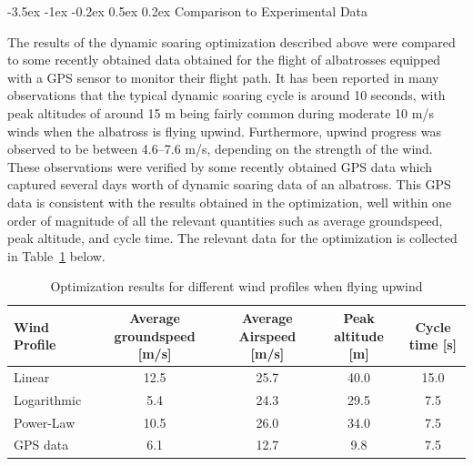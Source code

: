 \documentclass[11pt,letterpaper,onecolumn]{article}
\makeatletter
\renewcommand\subsection{\@startsection{subsection}{1}{\z@}%
{-3.5ex \@plus-1ex \@minus-0.2ex}%
{0.5ex \@plus0.2ex}%
{\fontsize{10pt}{10pt}\selectfont\bfseries\sffamily}}
\makeatother
\begin{document}
  \subsection{Comparison to Experimental Data}

  The results of the dynamic soaring optimization described above were compared to some recently obtained data obtained for the flight of albatrosses equipped with a GPS sensor to monitor their flight path.
  It has been reported in many observations that the typical dynamic soaring cycle is around 10 seconds, with peak altitudes of around 15 m being fairly common during moderate 10 m/s winds when the albatross is flying upwind.
  Furthermore, upwind progress was observed to be between 4.6--7.6 m/s, depending on the strength of the wind.
  These observations were verified by some recently obtained GPS data which captured several days worth of dynamic soaring data of an albatross.\cite{sachs.progress.2011,sachs.experimental.2013} This GPS data is consistent with the results obtained in the optimization, well within one order of magnitude of all the relevant quantities such as average groundspeed, peak altitude, and cycle time.
  The relevant data for the optimization is collected in Table~\ref{tab.results} below.

  \begin{table}[H]
    \centering
    \caption{Optimization results for different wind profiles when flying upwind}
    \begin{tabular}{lcccc}
      \toprule
      Wind Profile  & Average groundspeed [m/s] & Average Airspeed [m/s]  & Peak altitude [m] & Cycle time [s] \\ \midrule
      Linear        & 12.5                      & 25.7                    & 40.0              & 15.0 \\
      Logarithmic   & 5.4                       & 24.3                    & 29.5              & 7.5 \\
      Power-Law     & 10.5                      & 26.0                    & 34.0              & 7.5 \\ \midrule
      GPS data      & 6.1                       & 12.7                    & 9.8               & 7.5 \\
      \bottomrule
    \end{tabular}\label{tab.results}
  \end{table}
\end{document}
